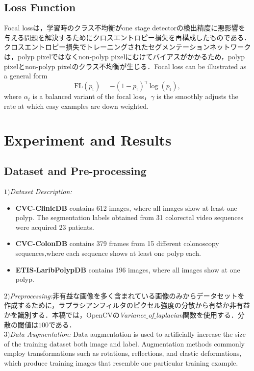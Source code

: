 \documentclass{article}
\begin{document}
\subsection{Loss Function}
Focal lossは，学習時のクラス不均衡がone stage detectorの検出精度に悪影響を与える問題を解決するためにクロスエントロピー損失を再構成したものである．クロスエントロピー損失でトレーニングされたセグメンテーションネットワークは，polyp pixelではなくnon-polyp pixelにむけてバイアスがかかるため，polyp pixelとnon-polyp pixelのクラス不均衡が生じる．Focal loss can be illustrated as a general form  \begin{equation}
\mathrm{FL}\left(p_{\mathrm{t}}\right)=-\left(1-p_{\mathrm{t}}\right)^{\gamma} \log \left(p_{\mathrm{t}}\right),
\end{equation}
where $\alpha_t$ is a balanced variant of the focal loss，$\gamma$ is the smoothly adjusts the rate at which easy examples are down weighted.
\section{Experiment and Results}
\label{sec:res}
\subsection{Dataset and Pre-processing}
\(1)\){\it Dataset Description:}
\begin{itemize}
\item {\bf CVC-ClinicDB} contains 612 images, where all images show at least one polyp. The segmentation labels obtained from 31 colorectal video sequences were acquired 23 patients.
\item {\bf CVC-ColonDB} contains 379 frames from 15 different colonoscopy sequences,where each sequence shows at least one polyp each.
\item {\bf ETIS-LaribPolypDB} contains 196 images, where all images show at one polyp. 
\end{itemize}
\(2)\){\it Preprocessing:}非有益な画像を多く含まれている画像のみからデータセットを作成するために，ラプラシアンフィルタのピクセル強度の分散から有益か非有益かを識別する．本稿では，OpenCVの{\it Variance$\_$of$\_$laplacian}関数を使用する．分散の閾値は$100$である．\\
\(3)\){\it Data Augmentation:} Data augmentation is used to artificially increase the size of the training dataset both image and label. Augmentation methods commonly employ transformations such as rotations, reflections, and elastic deformations, which produce training images that resemble one particular training example.
\end{document}
